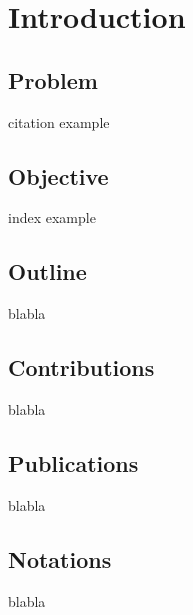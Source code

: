 %

\chapter{Introduction}

\section{Problem}

citation example \cite{book-full}

\section{Objective}

index example

\section{Outline}

blabla

\section{Contributions}

blabla

\section{Publications}

blabla

\section{Notations}

blabla%

